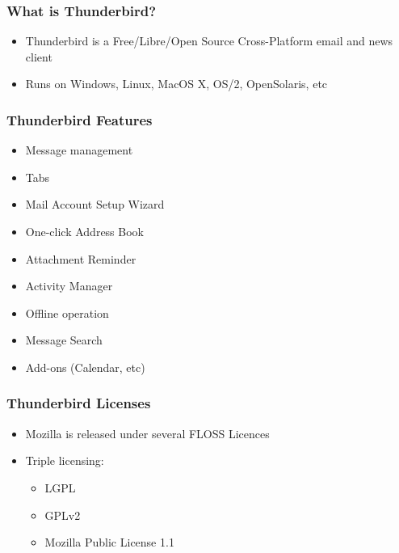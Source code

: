 \documentclass{beamer}
\begin{document}

\begin{frame}
\frametitle{What is Thunderbird?}
 \begin{itemize}
 \item Thunderbird is a Free/Libre/Open Source Cross-Platform email and news client
 \item Runs on Windows, Linux, MacOS X, OS/2, OpenSolaris, etc
 \end{itemize}
\end{frame}



\begin{frame}
 \frametitle{Thunderbird Features}
 \begin{itemize}
 \item Message management
 \item Tabs
 \item Mail Account Setup Wizard
 \item One-click Address Book
 \item Attachment Reminder
 \item Activity Manager
 \item Offline operation
 \item Message Search
 \item Add-ons (Calendar, etc)
 \end{itemize}
\end{frame}


\begin{frame}
 \frametitle{Thunderbird Licenses}
 \begin{itemize}
 \item Mozilla is released under several FLOSS Licences
 \item Triple licensing:
    \begin{itemize}
     \item LGPL
     \item GPLv2
     \item Mozilla Public License 1.1
    \end{itemize}

 \end{itemize}
\end{frame}

\end{document}
